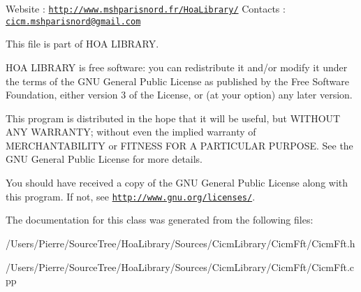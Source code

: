 Website \-: \href{http://www.mshparisnord.fr/HoaLibrary/}{\tt http\-://www.\-mshparisnord.\-fr/\-Hoa\-Library/} Contacts \-: \href{mailto:cicm.mshparisnord@gmail.com}{\tt cicm.\-mshparisnord@gmail.\-com}

This file is part of H\-O\-A L\-I\-B\-R\-A\-R\-Y.

H\-O\-A L\-I\-B\-R\-A\-R\-Y is free software\-: you can redistribute it and/or modify it under the terms of the G\-N\-U General Public License as published by the Free Software Foundation, either version 3 of the License, or (at your option) any later version.

This program is distributed in the hope that it will be useful, but W\-I\-T\-H\-O\-U\-T A\-N\-Y W\-A\-R\-R\-A\-N\-T\-Y; without even the implied warranty of M\-E\-R\-C\-H\-A\-N\-T\-A\-B\-I\-L\-I\-T\-Y or F\-I\-T\-N\-E\-S\-S F\-O\-R A P\-A\-R\-T\-I\-C\-U\-L\-A\-R P\-U\-R\-P\-O\-S\-E. See the G\-N\-U General Public License for more details.

You should have received a copy of the G\-N\-U General Public License along with this program. If not, see \href{http://www.gnu.org/licenses/}{\tt http\-://www.\-gnu.\-org/licenses/}. 

The documentation for this class was generated from the following files\-:\begin{DoxyCompactItemize}
\item 
/\-Users/\-Pierre/\-Source\-Tree/\-Hoa\-Library/\-Sources/\-Cicm\-Library/\-Cicm\-Fft/Cicm\-Fft.\-h\item 
/\-Users/\-Pierre/\-Source\-Tree/\-Hoa\-Library/\-Sources/\-Cicm\-Library/\-Cicm\-Fft/Cicm\-Fft.\-cpp\end{DoxyCompactItemize}
